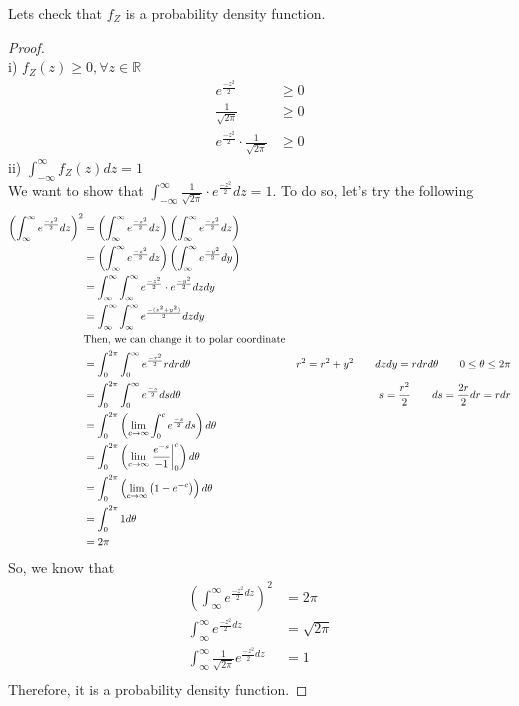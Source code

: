 \documentclass[11pt,oneside]{book}
\theoremstyle{break}
\theoremstyle{break}
\begin{document}
Lets check that $f_Z$ is a probability density function.\begin{proof}
\hfill\\
i) $f_Z(z)\geq 0, \forall z\in \mathbb{R}$\\
\begin{align*}
e^{\frac{-z^2}{2}}&\geq 0\\
\frac{1}{\sqrt{2\pi}}&\geq 0\\
e^{\frac{-z^2}{2}}\cdot \frac{1}{\sqrt{2\pi}} &\geq 0
\end{align*}
ii) $\int_{-\infty}^{\infty}f_Z(z)dz=1$\\
We want to show that $\int_{-\infty}^{\infty}\frac{1}{\sqrt{2\pi}}\cdot e^{\frac{-z^2}{2}}dz=1$. To do so, let's try the following\begin{align*}
\left( \int_{\infty}^{\infty}e^{\frac{-z^2}{2}}dz \right)^2&=\left(  \int_{\infty}^{\infty}e^{\frac{-z^2}{2}}dz \right)\left( \int_{\infty}^{\infty}e^{\frac{-z^2}{2}}dz \right)\\
&=\left(  \int_{\infty}^{\infty}e^{\frac{-z^2}{2}}dz \right)\left( \int_{\infty}^{\infty}e^{\frac{-y^2}{2}}dy \right)\\
&=\int_{\infty}^{\infty}\int_{\infty}^{\infty}e^{\frac{-z^2}{2}}\cdot e^{\frac{-y^2}{2}}dzdy\\
&=\int_{\infty}^{\infty}\int_{\infty}^{\infty}e^{\frac{-(z^2+y^2)}{2}}dzdy\\
&\text{Then, we can change it to polar coordinate}\\
&=\int_{0}^{2\pi}\int_{0}^{\infty}e^{\frac{-r^2}{2}}rdrd \theta& r^2=r^2+y^2 \text{\qquad} dzdy=rdrd\theta \text{\qquad}0\leq \theta\leq 2\pi \\
&=\int_{0}^{2\pi}\int_{0}^{\infty}e^{\frac{-s}{2}}ds d\theta&s=\frac{r^2}{2} \text{\qquad} ds=\frac{2r}{2}dr=rdr\\
&=\int_{0}^{2\pi}\left(\lim_{c\rightarrow\infty}\int_{0}^{c}e^{\frac{-s}{2}}ds \right)d\theta \\
&=\int_{0}^{2\pi}\left(\lim_{c\rightarrow\infty} \left. \frac{e^{-s}}{-1} \right|_{0}^{c} \right)d\theta \\
&=\int_{0}^{2\pi}\left(\lim_{c\rightarrow\infty} \left(1-e^{-c}\right) \right)d\theta \\
&=\int_{0}^{2\pi}1d\theta\\
&=2\pi 
\end{align*}
So, we know that \begin{align*}
\left( \int_{\infty}^{\infty}e^{\frac{-z^2}{2}dz}\right)^2&=2\pi\\
 \int_{\infty}^{\infty}e^{\frac{-z^2}{2}dz}&=\sqrt{2\pi}\\
  \int_{\infty}^{\infty}\frac{1}{\sqrt{2\pi}}e^{\frac{-z^2}{2}dz}&=1\\
\end{align*}
Therefore, it is a probability density function.
\end{proof}
\end{document}
